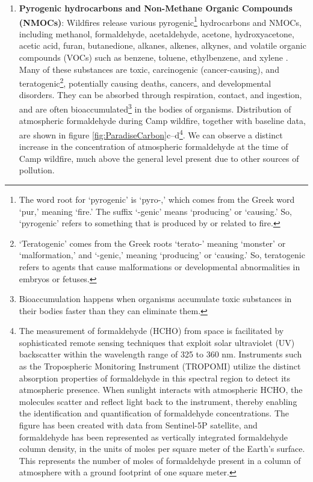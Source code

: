 \documentclass[
  12 pt,
]{Nemilov}
\begin{document}
\begin{enumerate}
\def\labelenumi{\arabic{enumi}.}
\setcounter{enumi}{1}
\item
  \textbf{Pyrogenic hydrocarbons and Non-Methane Organic Compounds (NMOCs)}: Wildfires release various pyrogenic\footnote{The word root for `pyrogenic' is `pyro-,' which comes from the Greek word `pur,' meaning `fire.' The suffix `-genic' means `producing' or `causing.' So, `pyrogenic' refers to something that is produced by or related to fire.} hydrocarbons and NMOCs, including methanol, formaldehyde, acetaldehyde, acetone, hydroxyacetone, acetic acid, furan, butanedione, alkanes, alkenes, alkynes, and volatile organic compounds (VOCs) such as benzene, toluene, ethylbenzene, and xylene \citep{liu2014wildland, liu2017airborne, urbanski2008chemical, urbanski2014wildland}. Many of these substances are toxic, carcinogenic (cancer-causing), and teratogenic\footnote{`Teratogenic' comes from the Greek roots `terato-' meaning `monster' or `malformation,' and `-genic,' meaning `producing' or `causing.' So, teratogenic refers to agents that cause malformations or developmental abnormalities in embryos or fetuses.}, potentially causing deaths, cancers, and developmental disorders. They can be absorbed through respiration, contact, and ingestion, and are often bioaccumulated\footnote{Bioaccumulation happens when organisms accumulate toxic substances in their bodies faster than they can eliminate them.} in the bodies of organisms. Distribution of atmospheric formaldehyde during Camp wildfire, together with baseline data, are shown in figure \ref{fig:ParadiseCarbon}c--d\footnote{The measurement of formaldehyde (HCHO) from space is facilitated by sophisticated remote sensing techniques that exploit solar ultraviolet (UV) backscatter within the wavelength range of 325 to 360 nm. Instruments such as the Tropospheric Monitoring Instrument (TROPOMI) utilize the distinct absorption properties of formaldehyde in this spectral region to detect its atmospheric presence. When sunlight interacts with atmospheric HCHO, the molecules scatter and reflect light back to the instrument, thereby enabling the identification and quantification of formaldehyde concentrations. The figure has been created with data from Sentinel-5P satellite, and formaldehyde has been represented as vertically integrated formaldehyde column density, in the units of moles per square meter of the Earth's surface. This represents the number of moles of formaldehyde present in a column of atmosphere with a ground footprint of one square meter.}. We can observe a distinct increase in the concentration of atmospheric formaldehyde at the time of Camp wildfire, much above the general level present due to other sources of pollution.

\end{enumerate}
\end{document}
